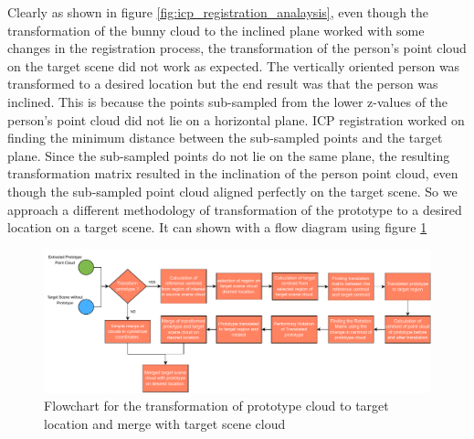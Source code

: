 Clearly as shown in figure \ref{fig:icp_registration_analaysis}, even though the transformation of the bunny cloud to the inclined plane worked with some changes in the registration process, the transformation of the person's point cloud on the target scene did not work as expected. The vertically oriented person was transformed to a desired location but the end result was that the person was inclined. This is because the points sub-sampled from the lower z-values of the person's point cloud did not lie on a horizontal plane. ICP registration worked on finding the minimum distance between the sub-sampled points and the target plane. Since the sub-sampled points do not lie on the same plane, the resulting transformation matrix resulted in the inclination of the person point cloud, even though the sub-sampled point cloud aligned perfectly on the target scene. So we approach a different methodology of transformation of the prototype to a desired location on a target scene. It can shown with a flow diagram using figure \ref{fig:prototype_transform_and_merge}

\begin{figure}[htbp]
    \centering
    \includegraphics[width=1\linewidth]{97_graphics/concepts/prototype_extraction.pdf}
    \caption{Flowchart for the transformation of prototype cloud to target location and merge with target scene cloud}
    \label{fig:prototype_transform_and_merge}
\end{figure}

